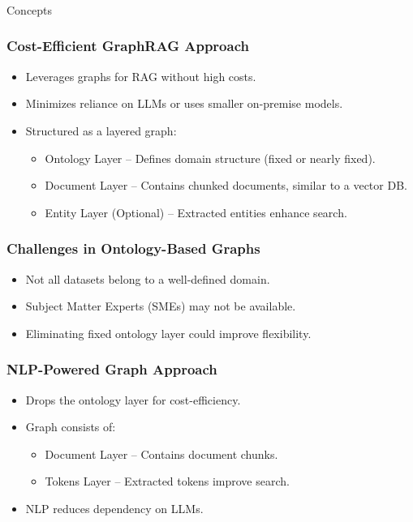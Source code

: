 \begin{frame}[fragile]\frametitle{}
\begin{center}
{\Large Concepts}
\end{center}
\end{frame}


\begin{frame}[fragile]\frametitle{Cost-Efficient GraphRAG Approach}
    \begin{itemize}
        \item Leverages graphs for RAG without high costs.
        \item Minimizes reliance on LLMs or uses smaller on-premise models.
        \item Structured as a layered graph:
        \begin{itemize}
            \item Ontology Layer – Defines domain structure (fixed or nearly fixed).
            \item Document Layer – Contains chunked documents, similar to a vector DB.
            \item Entity Layer (Optional) – Extracted entities enhance search.
        \end{itemize}
    \end{itemize}
\end{frame}

\begin{frame}[fragile]\frametitle{Challenges in Ontology-Based Graphs}
    \begin{itemize}
        \item Not all datasets belong to a well-defined domain.
        \item Subject Matter Experts (SMEs) may not be available.
        \item Eliminating fixed ontology layer could improve flexibility.
    \end{itemize}
\end{frame}

\begin{frame}[fragile]\frametitle{NLP-Powered Graph Approach}
    \begin{itemize}
        \item Drops the ontology layer for cost-efficiency.
        \item Graph consists of:
        \begin{itemize}
            \item Document Layer – Contains document chunks.
            \item Tokens Layer – Extracted tokens improve search.
        \end{itemize}
        \item NLP reduces dependency on LLMs.
    \end{itemize}
\end{frame}


